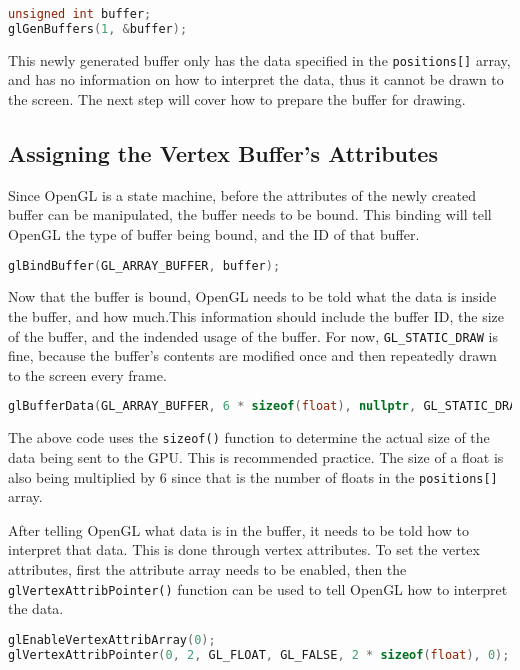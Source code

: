 \documentclass{article}
\newcommand{\ilcode}[1]{{\footnotesize\texttt{#1}}}
\begin{document}
\begin{lstlisting}[language=C++]
unsigned int buffer;
glGenBuffers(1, &buffer);
\end{lstlisting}

This newly generated buffer only has the data specified in the \ilcode{positions[]} array, and has no information on how to interpret the data, thus it cannot be drawn to the screen. The next step will cover how to prepare the buffer for drawing.

\break

\subsection{Assigning the Vertex Buffer's Attributes}

Since OpenGL is a state machine, before the attributes of the newly created buffer can be manipulated, the buffer needs to be bound. This binding will tell OpenGL the type of buffer being bound, and the ID of that buffer.

\begin{lstlisting}[language=C++]
glBindBuffer(GL_ARRAY_BUFFER, buffer);
\end{lstlisting}

Now that the buffer is bound, OpenGL needs to be told what the data is inside the buffer, and how much.This information should include the buffer ID, the size of the buffer, and the indended usage of the buffer. For now, \ilcode{GL\_STATIC\_DRAW} is fine, because the buffer's contents are modified once and then repeatedly drawn to the screen every frame.

\begin{lstlisting}[language=C++]
glBufferData(GL_ARRAY_BUFFER, 6 * sizeof(float), nullptr, GL_STATIC_DRAW);
\end{lstlisting}

The above code uses the \ilcode{sizeof()} function to determine the actual size of the data being sent to the GPU. This is recommended practice. The size of a float is also being multiplied by 6 since that is the number of floats in the \ilcode{positions[]} array.

After telling OpenGL what data is in the buffer, it needs to be told how to interpret that data. This is done through vertex attributes. To set the vertex attributes, first the attribute array needs to be enabled, then the \ilcode{glVertexAttribPointer()} function can be used to tell OpenGL how to interpret the data.

\begin{lstlisting}[language=C++]
glEnableVertexAttribArray(0);
glVertexAttribPointer(0, 2, GL_FLOAT, GL_FALSE, 2 * sizeof(float), 0);
\end{lstlisting}
\end{document}
